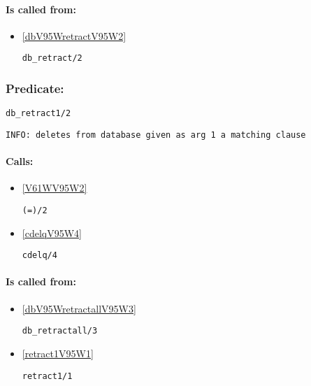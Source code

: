 \paragraph{Is called from:} 
\begin{itemize}
\item \ref{dbV95WretractV95W2} 
\begin{verbatim}
db_retract/2
\end{verbatim}

\end{itemize}

\subsubsection{Predicate:} \label{dbV95Wretract1V95W2}

\begin{verbatim}
db_retract1/2
\end{verbatim}

{\small \begin{verbatim}
INFO: deletes from database given as arg 1 a matching clause

\end{verbatim}}
\paragraph{Calls:} 
\begin{itemize}
\item \ref{V61WV95W2} 
\begin{verbatim}
(=)/2
\end{verbatim}

\item \ref{cdelqV95W4} 
\begin{verbatim}
cdelq/4
\end{verbatim}

\end{itemize}
\paragraph{Is called from:} 
\begin{itemize}
\item \ref{dbV95WretractallV95W3} 
\begin{verbatim}
db_retractall/3
\end{verbatim}

\item \ref{retract1V95W1} 
\begin{verbatim}
retract1/1
\end{verbatim}

\end{itemize}

